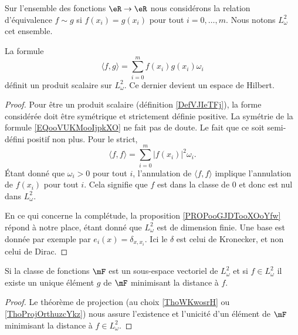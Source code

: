 Sur l'ensemble des fonctions \( \eR\to\eR\) nous considérons la relation d'équivalence \( f\sim g\) si \( f(x_i)=g(x_i)\) pour tout \( i=0,\ldots, m\). Nous notons \(  L^2_{\omega}  \) cet ensemble.

\begin{proposition}
    La formule 
    \begin{equation}        \label{EQooVUKMooIjpkXO}
        \langle f, g\rangle =\sum_{i=0}^mf(x_i)g(x_i)\omega_i
    \end{equation}
    définit un produit scalaire sur \( L^2_{\omega}\). Ce dernier devient un espace de Hilbert.
\end{proposition}

\begin{proof}
    Pour être un produit scalaire (définition \ref{DefVJIeTFj}), la forme considérée doit être symétrique et strictement définie positive. La symétrie de la formule \eqref{EQooVUKMooIjpkXO} ne fait pas de doute. Le fait que ce soit semi-défini positif non plus. Pour le strict,
    \begin{equation}
        \langle f, f\rangle =\sum_{i=0}^m| f(x_i) |^2\omega_i.
    \end{equation}
    Étant donné que \( \omega_i>0\) pour tout \( i\), l'annulation de \( \langle f, f\rangle \) implique l'annulation de \( f(x_i)\) pour tout \( i\). Cela signifie que \( f\) est dans la classe de \( 0\) et donc est nul dans \( L^2_{\omega}\).

    En ce qui concerne la complétude, la proposition \ref{PROPooGJDTooXOoYfw} répond à notre place, étant donné que \( L^2_{\omega}\) est de dimension finie. Une base est donnée par exemple par \( e_i(x)=\delta_{x,x_{i}}\). Ici le \( \delta\) est celui de Kronecker, et non celui de Dirac.
\end{proof}

\begin{lemma}
    Si la classe de fonctions \( \mF\) est un sous-espace vectoriel de \( L^2_{\omega}\) et si \( f\in L^2_{\omega}\) il existe un unique élément \( g\) de \( \mF\) minimisant la distance à \( f\).
\end{lemma}

\begin{proof}
    Le théorème de projection (au choix \ref{ThoWKwosrH} ou \ref{ThoProjOrthuzcYkz}) nous assure l'existence et l'unicité d'un élément de \( \mF\) minimisant la distance à \( f\in L^2_{\omega}\).
\end{proof}

